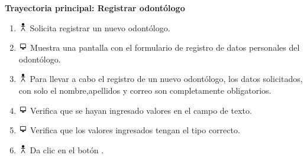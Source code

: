\textbf{Trayectoria principal: Registrar odontólogo}  
\begin{enumerate}
\item \includegraphics[height=1em]{pictures/actor.png} Solicita registrar un nuevo odontólogo.
\item \includegraphics[height=1em]{pictures/sistema.png} Muestra una pantalla con el formulario de registro de datos personales del odontólogo.
\item \includegraphics[height=1em]{pictures/actor.png} Para llevar a cabo el registro de un nuevo odontólogo, los datos solicitados, con solo el nombre,apellidos y correo son completamente obligatorios.
\item \includegraphics[height=1em]{pictures/sistema.png} Verifica que se hayan ingresado valores en el campo de texto.
\item \includegraphics[height=1em]{pictures/sistema.png} Verifica que los valores ingresados tengan el tipo correcto.
\item \includegraphics[height=1em]{pictures/actor.png} Da clic en el botón .
\end{enumerate} \bigskip


